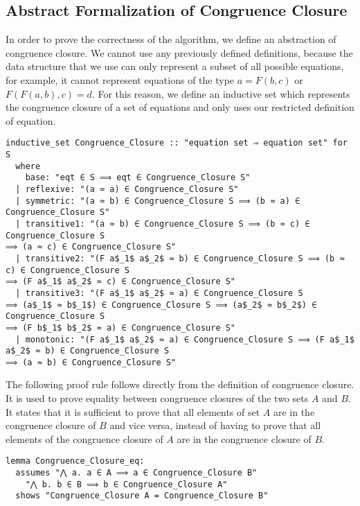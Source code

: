\subsection{Abstract Formalization of Congruence Closure}
\label{subsection:abstraction}

In order to prove the correctness of the algorithm, we define an abstraction of congruence closure. We cannot use any previously defined definitions, because the data structure that we use can only represent a subset of all possible equations, for example, it cannot represent equations of the type $a = F(b, c)$ or $F (F (a, b), c) = d$. For this reason, we define an inductive set which represents the congruence closure of a set of equations and only uses our restricted definition of equation.

\begin{lstlisting}
inductive_set Congruence_Closure :: "equation set ⇒ equation set" for S
  where
    base: "eqt ∈ S ⟹ eqt ∈ Congruence_Closure S"
  | reflexive: "(a ≈ a) ∈ Congruence_Closure S"
  | symmetric: "(a ≈ b) ∈ Congruence_Closure S ⟹ (b ≈ a) ∈ Congruence_Closure S"
  | transitive1: "(a ≈ b) ∈ Congruence_Closure S ⟹ (b ≈ c) ∈ Congruence_Closure S
⟹ (a ≈ c) ∈ Congruence_Closure S"
  | transitive2: "(F a$_1$ a$_2$ ≈ b) ∈ Congruence_Closure S ⟹ (b ≈ c) ∈ Congruence_Closure S
⟹ (F a$_1$ a$_2$ ≈ c) ∈ Congruence_Closure S"
  | transitive3: "(F a$_1$ a$_2$ ≈ a) ∈ Congruence_Closure S
⟹ (a$_1$ ≈ b$_1$) ∈ Congruence_Closure S ⟹ (a$_2$ ≈ b$_2$) ∈ Congruence_Closure S
⟹ (F b$_1$ b$_2$ ≈ a) ∈ Congruence_Closure S"
  | monotonic: "(F a$_1$ a$_2$ ≈ a) ∈ Congruence_Closure S ⟹ (F a$_1$ a$_2$ ≈ b) ∈ Congruence_Closure S
⟹ (a ≈ b) ∈ Congruence_Closure S"
\end{lstlisting}

The following proof rule follows directly from the definition of congruence closure. It is used to prove equality between congruence closures of the two sets $A$ and $B$. It states that it is sufficient to prove that all elements of set $A$ are in the congruence closure of $B$ and vice versa, instead of having to prove that all elements of the congruence closure of $A$ are in the congruence closure of $B$.

\begin{lstlisting}
lemma Congruence_Closure_eq:
  assumes "⋀ a. a ∈ A ⟹ a ∈ Congruence_Closure B"
    "⋀ b. b ∈ B ⟹ b ∈ Congruence_Closure A"
  shows "Congruence_Closure A = Congruence_Closure B"
\end{lstlisting}

